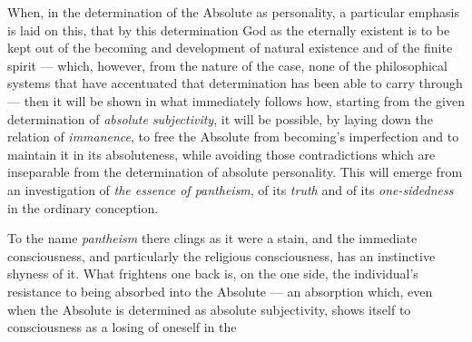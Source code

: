 \documentclass[12pt,a4paper]{book}
\begin{document}
When, in the determination of the Absolute as personality, a particular
emphasis is laid on this, that by this determination God as the eternally
existent is to be kept out of the becoming and development of natural
existence and of the finite spirit --- which, however, from the nature of the
case, none of the philosophical systems that have accentuated that
determination has been able to carry through --- then it will be shown in what
immediately follows how, starting from the given determination of
\emph{absolute subjectivity}, it will be possible, by laying down the relation
of \emph{immanence}, to free the Absolute from becoming's imperfection and to
maintain it in its absoluteness, while avoiding those contradictions which are
inseparable from the determination of absolute personality. This will emerge
from an investigation of \emph{the essence of pantheism}, of its
\emph{truth} and of its \emph{one-sidedness} in the ordinary conception.

To the name \emph{pantheism} there clings as it were a stain, and the
immediate consciousness, and particularly the religious consciousness, has an
instinctive shyness of it. What frightens one back is, on the one side, the
individual's resistance to being absorbed into the Absolute --- an absorption
which, even when the Absolute is determined as absolute subjectivity, shows
itself to consciousness as a losing of oneself in the
\end{document}
